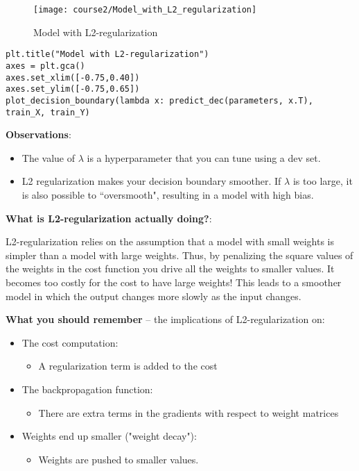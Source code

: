 \begin{figure}[h]
\begin{center}
\texttt{[image: course2/Model\_with\_L2\_regularization]}
\caption{Model with L2-regularization}
\end{center}
\end{figure}

\begin{verbatim}
plt.title("Model with L2-regularization")
axes = plt.gca()
axes.set_xlim([-0.75,0.40])
axes.set_ylim([-0.75,0.65])
plot_decision_boundary(lambda x: predict_dec(parameters, x.T), train_X, train_Y)
\end{verbatim}


{\textbf {Observations}}:
\begin{itemize}
\item The value of $\lambda$ is a hyperparameter that you can tune using a dev set.
\item L2 regularization makes your decision boundary smoother. If $\lambda$ is too large, it is also possible to ``oversmooth", resulting in a model with high bias.
\end{itemize}
{\textbf {What is L2-regularization actually doing?}}:

L2-regularization relies on the assumption that a model with small weights is simpler than a model with large weights. Thus, by penalizing the square values of the weights in the cost function you drive all the weights to smaller values. It becomes too costly for the cost to have large weights! This leads to a smoother model in which the output changes more slowly as the input changes. 


{\color{red} {\textbf {What you should remember}} -- the implications of L2-regularization on:
\begin{itemize}
\item The cost computation:
    \begin{itemize}
    \item  A regularization term is added to the cost
    \end{itemize}
\item The backpropagation function:
    \begin{itemize}
    \item There are extra terms in the gradients with respect to weight matrices
    \end{itemize}
\item Weights end up smaller ("weight decay"): 
    \begin{itemize}
    \item Weights are pushed to smaller values.
    \end{itemize}
\end{itemize}
}

